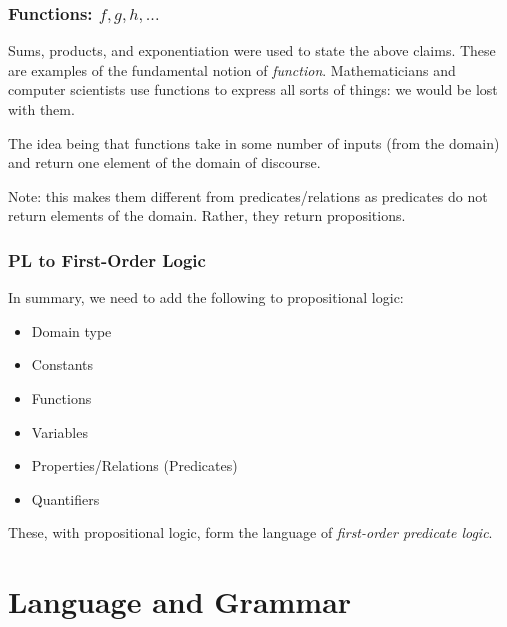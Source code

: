 \documentclass{beamer}
\theoremstyle{indentDefn} \newtheorem{defn}[]{Definition}
\begin{document}
\begin{frame}
	\frametitle{Functions: $f,g,h,...$}
	
	Sums, products, and exponentiation were used to state the above claims. These are examples of the fundamental notion of \emph{function}. Mathematicians and computer scientists use functions to express all sorts of things: we would be lost with them. 
	
	\vspace{3mm}
	
	The idea being that functions take in some number of inputs (from the domain) and return one element of the domain of discourse. 
	
	\vspace{3mm} 
	
	Note: this makes them different from predicates/relations as predicates do not return elements of the domain. Rather, they return propositions.

	\vspace{3mm}

\end{frame}

\begin{frame}
	\frametitle{PL to First-Order Logic}
	
	In summary, we need to add the following to propositional logic: 
	
	\begin{itemize}
		\item Domain type
		\item Constants
		\item Functions
		\item Variables
		\item Properties/Relations (Predicates)
		\item Quantifiers
	\end{itemize}
	
	These, with propositional logic, form the language of \emph{first-order predicate logic}. 
	
	\vspace{2mm} 
	
\end{frame}

\section{Language and Grammar}
\end{document}
